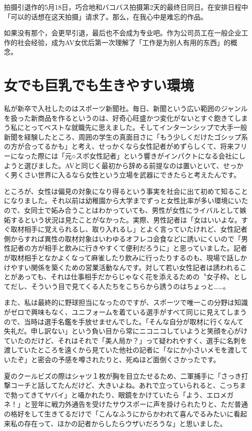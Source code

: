 \documentclass[12pt,UTF8]{ctexbook}
\begin{document}
拍摄引退作的5月18日，巧合地和バコバス拍摄第2天的最终日同日。在安排日程中「可以的话想在这天拍摄」请求了。那么，在我心中是难忘的作品。

如果没有那个，会更早引退，最后也不会成为专业吧。作为公司员工在一般企业工作的社会经验，成为AV女优后第一次理解了「工作是为别人有用的东西」的概念。

\section{女でも巨乳でも生きやすい環境}

私が新卒で入社したのはスポーツ新聞社。毎日、新聞という広い範囲のジャンルを扱った新商品を作るというのは、好奇心旺盛かつ変化がないとすぐ飽きてしまう私にとってベストな就職先に思えました。そしてインターンシップで大手一般新聞を経験したところ、周囲の学生の真面目さに「もう少しくだけたゴシップ系の方が合ってるかも」と考え、せっかくなら女性記者がめずらしくて、将来フリーになった際には「元○スポ女性記者」という響きがインパクトになる会社にしようと選びました。AVと同じく最初から辞める前提なのは置いといて、せっかく男くさい世界に入るなら女性という立場を武器にできたらと考えたんです。

ところが、女性は偏見の対象になり得るという事実を社会に出て初めて知ることになりました。それ以前は幼稚園から大学までずっと女性比率が多い環境にいたので、女同士で妬み合うことはわかっていても、男性が女性にライバルとして嫉妬するという状況は見たことがなかった。実際、男性記者は「女はいいよな。すぐ取材相手に覚えられるし、取り入れるし」とよく言っていたけれど、女性記者側からすれば異性の取材対象はいわゆるオフレコ会食などに誘いにくいので「男性記者の方が相手と飲みに行きやすくて便利だろうに」と思っていました。記者が取材相手となかよくなって麻雀したり飲みに行ったりするのも、現場で話しかけやすい関係を築くための営業活動なんです。対して若い女性記者は誘われることがあっても、それは仕事相手だからじゃなく花を添えるための〝女子枠〟としてだし、そういう目で見てくる人たちをこちらから誘うのはちょっと……。

また、私は最終的に野球担当になったのですが、スポーツで唯一この分野は知識がゼロで興味もなく、ユニフォームを着ている選手がすべて同じに見えてしまうので、当時は選手名鑑を手放せませんでした。「そんな自分が取材に行くなんて失礼だ。申し訳ない」という負い目から常にニコニコしていようと笑顔を心がけていたのだけど、それはそれで「美人局か？」って疑われやすく、選手に名刺を渡していたところを遠くから見ていた他社の記者に「なにか小さいメモを渡していたぞ」と密会の予感を噂されたりと、死ぬほど面倒くさかったです。

夏のクールビズの際はシャツ１枚が胸を目立たせるため、二軍捕手に「さっき打撃コーチと話してたんだけど、大きいよね。あれで立っていられると、こっちまで勃ってきてヤバイ」と囁かれたり、眼鏡をかけていたら「よう、エロメガネ！」と翌年に戦力外通告を受けたサウスポーに声を掛けられたりと、ただ普通の格好をして生きてるだけで「こんなふうにからかわれて喜んでるみたいに看起来私の存在って、ほかの記者からしたらウザいだろうな」と思いました。
\end{document}
